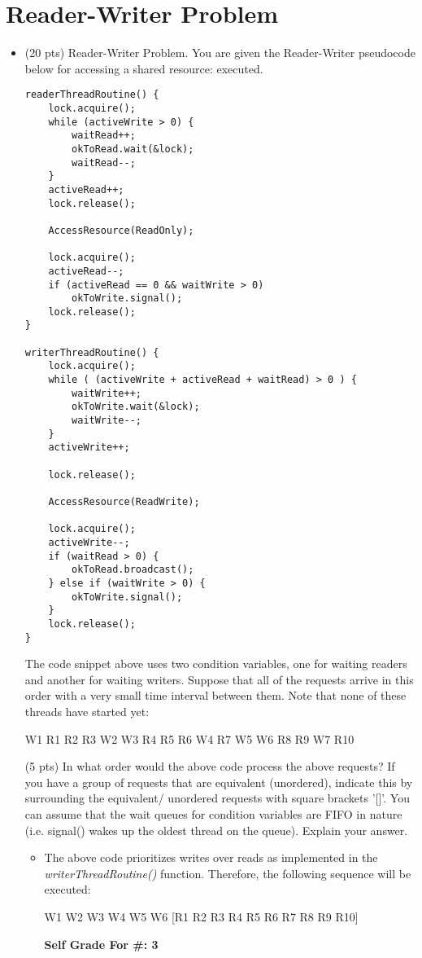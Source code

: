 \documentclass[conference]{IEEEtran}
\begin{document}
\section{Reader-Writer Problem}
\begin{itemize}
\item (20 pts) Reader-Writer Problem. You are given the Reader-Writer pseudocode below for
accessing a shared resource:
executed.
\begin{lstlisting}
readerThreadRoutine() {
	lock.acquire();
	while (activeWrite > 0) {
		waitRead++;
		okToRead.wait(&lock);
		waitRead--;
	}
	activeRead++;
	lock.release();
	
	AccessResource(ReadOnly);
	
	lock.acquire();
	activeRead--;
	if (activeRead == 0 && waitWrite > 0)
		okToWrite.signal();
	lock.release();
}

writerThreadRoutine() {
	lock.acquire();
	while ( (activeWrite + activeRead + waitRead) > 0 ) {
		waitWrite++;
		okToWrite.wait(&lock);
		waitWrite--;
	}
	activeWrite++;
	
	lock.release();
	
	AccessResource(ReadWrite);
	
	lock.acquire();
	activeWrite--;
	if (waitRead > 0) {
		okToRead.broadcast();
	} else if (waitWrite > 0) {
		okToWrite.signal();
	}
	lock.release();
}
\end{lstlisting}

The code snippet above uses two condition variables, one for waiting readers and another for
waiting writers. Suppose that all of the requests arrive in this order with a very small time
interval between them. Note that none of these threads have started yet:
\begin{center}
W1 R1 R2 R3 W2 W3 R4 R5 R6 W4 R7 W5 W6 R8 R9 W7 R10
\end{center}

(5 pts) In what order would the above code process the above requests? If you have a group
of requests that are equivalent (unordered), indicate this by surrounding the equivalent/
unordered requests with square brackets '[]'. You can assume that the wait queues for condition
variables are FIFO in nature (i.e. signal() wakes up the oldest thread on the queue). Explain your
answer.
\begin{itemize}
	\item The above code prioritizes writes over reads as implemented in the \textit{writerThreadRoutine()} function. Therefore, the following sequence will be executed:
	\begin{center}
		W1 W2 W3 W4 W5 W6 [R1 R2 R3 R4 R5 R6 R7 R8 R9 R10]
	\end{center}
\begin{center}
	\textbf{Self Grade For \#: 3}
\end{center}
\end{itemize}


\end{itemize}
\end{document}
